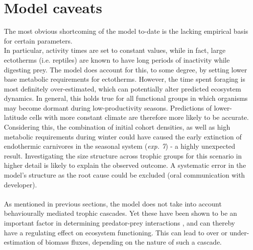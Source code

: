 \section{Model caveats}
The most obvious shortcoming of the model to-date is the lacking empirical basis for certain parameters. \\
In particular, activity times are set to constant values, while in fact, large ectotherms (i.e. reptiles) are known to have long periods of inactivity while digesting prey. 
The model does account for this, to some degree, by setting lower base metabolic requirements for ectotherms. However, the time spent foraging is most definitely over-estimated, which can potentially alter predicted ecosystem dynamics. 
In general, this holds true for all functional groups in which organisms may become dormant during low-productivity seasons. Predictions of lower-latitude cells with more constant climate are therefore more likely to be accurate. \\
Considering this, the combination of initial cohort densities, as well as high metabolic requirements during winter could have  caused the early extinction of endothermic carnivores in the seasonal system (\textit{exp. 7}) - a highly unexpected result. Investigating the size structure across trophic groups for this scenario in higher detail is likely to explain the observed outcome. A systematic error in the model's structure as the root cause could be excluded (oral communication with developer).
\\\\
As mentioned in previous sections, the model does not take into account behaviourally mediated trophic cascades. Yet these have been shown to be an important factor in determining predator-prey interactions \citep[e.g][]{Fortin2005,Duffy2007,Beschta2009}, and can thereby have a regulating effect on ecosystem functioning. This can lead to over or under-estimation of biomass fluxes, depending on the nature of such a cascade.\\ 
